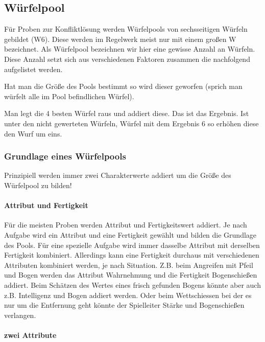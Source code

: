 \documentclass{article}
\begin{document}
\begin{center}
\subsection{Würfelpool}
\end{center}

Für Proben zur Konfliktlösung werden Würfelpools von sechsseitigen Würfeln gebildet (W6). Diese werden im Regelwerk
meist nur mit einem großen W bezeichnet. Als Würfelpool bezeichnen wir hier eine gewisse Anzahl an Würfeln. Diese
Anzahl setzt sich aus verschiedenen Faktoren zusammen die nachfolgend aufgelistet werden.

Hat man die Größe des Pools bestimmt so wird dieser geworfen (sprich man würfelt alle im Pool befindlichen Würfel).

Man legt die 4 besten Würfel raus und addiert diese. Das ist das Ergebnis.
Ist unter den nicht gewerteten Würfeln, Würfel mit dem Ergebnis 6 so erhöhen diese den Wurf um eins.

\subsubsection{Grundlage eines Würfelpools}

Prinzipiell werden immer zwei Charakterwerte addiert um die Größe des Würfelpool zu bilden!

\paragraph{Attribut und Fertigkeit}

Für die meisten Proben werden Attribut und Fertigkeitswert addiert. Je nach Aufgabe wird ein Attribut und eine
Fertigkeit gewählt und bilden die Grundlage des Pools. Für eine spezielle Aufgabe wird immer dasselbe Attribut
mit derselben Fertigkeit kombiniert. Allerdings kann eine Fertigkeit durchaus mit verschiedenen Attributen kombiniert
werden, je nach Situation. Z.B. beim Angreifen mit Pfeil und Bogen werden das Attribut Wahrnehmung und die Fertigkeit
Bogenschießen addiert. Beim Schätzen des Wertes eines frisch gefunden Bogens könnte aber auch z.B. Intelligenz und
Bogen addiert werden. Oder beim Wettschiessen bei der es nur um die Entfernung geht könnte der Spielleiter Stärke und
Bogenschießen verlangen.

\paragraph{zwei Attribute}
\end{document}
